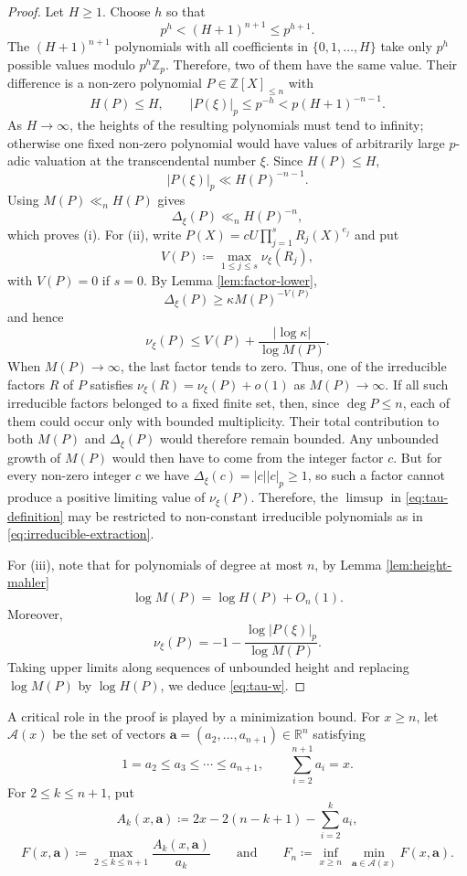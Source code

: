 \documentclass[10pt,a4paper]{amsart}
\newcommand{\Z}{\mathbb Z}
\newcommand{\R}{\mathbb R}
\newcommand{\Zp}{\mathbb Z_p}
\newcommand{\calA}{\mathcal A}
\begin{document}
\begin{proof}
Let $H\geq1$. Choose $h$ so that
$$
p^h<(H+1)^{n+1}\leq p^{h+1}.
$$
The $(H+1)^{n+1}$ polynomials with all coefficients in $\{0,1,\ldots,H\}$ take only $p^h$ possible values modulo $p^h\Zp$. Therefore, two of them have the same value. Their difference is a non-zero polynomial $P\in\Z[X]_{\leq n}$ with
$$
H(P)\leq H,
\qquad |P(\xi)|_p\leq p^{-h}<p(H+1)^{-n-1}.
$$
As $H\to\infty$, the heights of the resulting polynomials must tend to infinity; otherwise one fixed non-zero polynomial would have values of arbitrarily large $p$-adic valuation at the transcendental number $\xi$. Since $H(P)\leq H$,
$$
|P(\xi)|_p\ll H(P)^{-n-1}.
$$
Using $M(P)\ll_n H(P)$ gives
$$
\Delta_\xi(P)\ll_n H(P)^{-n},
$$
which proves (i). For (ii), write
$P(X)=cU\prod_{j=1}^sR_j(X)^{e_j}$ and put
$$
V(P)\coloneqq\max_{1\leq j\leq s}\nu_\xi(R_j),
$$
with $V(P)=0$ if $s=0$. By Lemma \ref{lem:factor-lower},
$$
\Delta_\xi(P)\geq\kappa M(P)^{-V(P)}
$$
and hence
$$
\nu_\xi(P)\leq V(P)+\frac{|\log\kappa|}{\log M(P)}.
$$
When $M(P) \to\infty$, the last factor tends to zero. Thus, one of the irreducible factors $R$ of $P$ satisfies $\nu_\xi (R)=\nu_\xi(P)+o(1)$ as $M(P)\to\infty$. If all such irreducible factors belonged to a fixed finite set, then, since $\deg P\leq n$, each of them could occur only with bounded multiplicity. Their total contribution to both $M(P)$ and $\Delta_\xi(P)$ would therefore remain bounded. Any unbounded growth of $M(P)$ would then have to come from the integer factor $c$. But for every non-zero integer $c$ we have $\Delta_\xi(c)=|c||c|_p \geq 1$, so such a factor cannot produce a positive limiting value of $\nu_\xi(P)$. Therefore, the $\limsup$ in \eqref{eq:tau-definition} may be restricted to non-constant irreducible polynomials as in \eqref{eq:irreducible-extraction}.

For (iii), note that for polynomials of degree at most $n$, by Lemma \ref{lem:height-mahler}
$$
\log M(P)=\log H(P)+O_n(1).
$$
Moreover,
$$
\nu_\xi(P)
=
-1-\frac{\log|P(\xi)|_p}{\log M(P)}.
$$
Taking upper limits along sequences of unbounded height and replacing $\log M(P)$ by $\log H(P)$, we deduce \eqref{eq:tau-w}.
\end{proof}

A critical role in the proof is played by a minimization bound. For $x\geq n$, let $\calA(x)$ be the set of
vectors $\mathbf a=(a_2,\ldots,a_{n+1})\in\R^n$ satisfying
$$
1=a_2\leq a_3\leq\cdots\leq a_{n+1},
\qquad \sum_{i=2}^{n+1}a_i=x.
$$
For $2\leq k\leq n+1$, put
$$
A_k(x,\mathbf a)
\coloneqq2x-2(n-k+1)-\sum_{i=2}^k a_i,
$$
$$
F(x,\mathbf a)\coloneqq\max_{2\leq k\leq n+1}
\frac{A_k(x,\mathbf a)}{a_k}
\qquad \text{and}\qquad
F_n\coloneqq\inf_{x\geq n}\ \min_{\mathbf a\in\calA(x)}F(x,\mathbf a).
$$
\end{document}
